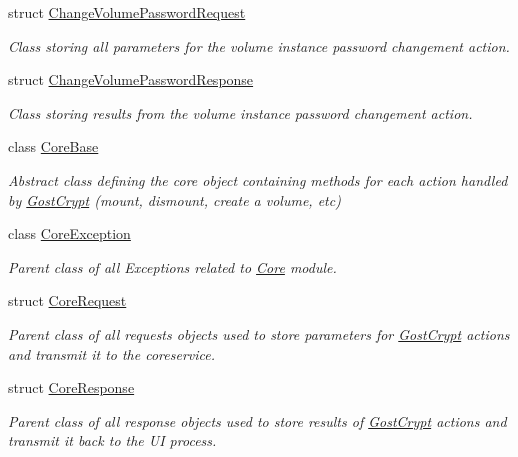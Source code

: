 \begin{DoxyCompactItemize}
struct \hyperlink{struct_gost_crypt_1_1_core_1_1_change_volume_password_request}{Change\+Volume\+Password\+Request}
\begin{DoxyCompactList}\small\item\em Class storing all parameters for the volume instance password changement action. \end{DoxyCompactList}\item 
struct \hyperlink{struct_gost_crypt_1_1_core_1_1_change_volume_password_response}{Change\+Volume\+Password\+Response}
\begin{DoxyCompactList}\small\item\em Class storing results from the volume instance password changement action. \end{DoxyCompactList}\item 
class \hyperlink{class_gost_crypt_1_1_core_1_1_core_base}{Core\+Base}
\begin{DoxyCompactList}\small\item\em Abstract class defining the core object containing methods for each action handled by \hyperlink{namespace_gost_crypt}{Gost\+Crypt} (mount, dismount, create a volume, etc) \end{DoxyCompactList}\item 
class \hyperlink{class_gost_crypt_1_1_core_1_1_core_exception}{Core\+Exception}
\begin{DoxyCompactList}\small\item\em Parent class of all Exceptions related to \hyperlink{namespace_gost_crypt_1_1_core}{Core} module. \end{DoxyCompactList}\item 
struct \hyperlink{struct_gost_crypt_1_1_core_1_1_core_request}{Core\+Request}
\begin{DoxyCompactList}\small\item\em Parent class of all requests objects used to store parameters for \hyperlink{namespace_gost_crypt}{Gost\+Crypt} actions and transmit it to the coreservice. \end{DoxyCompactList}\item 
struct \hyperlink{struct_gost_crypt_1_1_core_1_1_core_response}{Core\+Response}
\begin{DoxyCompactList}\small\item\em Parent class of all response objects used to store results of \hyperlink{namespace_gost_crypt}{Gost\+Crypt} actions and transmit it back to the UI process. \end{DoxyCompactList}\item 

\end{DoxyCompactItemize}

